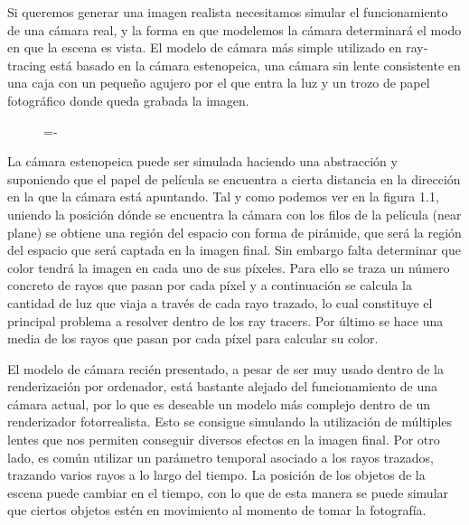 Si queremos generar una imagen realista necesitamos simular el funcionamiento de una cámara real, y la forma en que modelemos la cámara determinará el modo en que la escena es vista. El modelo de cámara más simple utilizado en ray-tracing está basado en la cámara estenopeica, una cámara sin lente consistente en una caja con un pequeño agujero por el que entra la luz y un trozo de papel fotográfico donde queda grabada la imagen.

\begin{figure}[h]
  \lineskip=-\fboxrule
\end{figure}

La cámara estenopeica puede ser simulada haciendo una abstracción y suponiendo que el papel de película se encuentra a cierta distancia en la dirección en la que la cámara está apuntando. Tal y como podemos ver en la figura 1.1, uniendo la posición dónde se encuentra la cámara con los filos de la película (near plane) se obtiene una región del espacio con forma de pirámide, que será la región del espacio que será captada en la imagen final. Sin embargo falta determinar que color tendrá la imagen en cada uno de sus píxeles. Para ello se traza un número concreto de rayos que pasan por cada píxel y a continuación se calcula la cantidad de luz que viaja a través de cada rayo trazado, lo cual constituye el principal problema a resolver dentro de los ray tracers. Por último se hace una media de los rayos que pasan por cada píxel para calcular su color.

El modelo de cámara recién presentado, a pesar de ser muy usado dentro de la renderización por ordenador, está bastante alejado del funcionamiento de una cámara actual, por lo que es deseable un modelo más complejo dentro de un renderizador fotorrealista. Esto se consigue simulando la utilización de múltiples lentes que nos permiten conseguir diversos efectos en la imagen final. Por otro lado, es común utilizar un parámetro temporal asociado a los rayos trazados, trazando varios rayos a lo largo del tiempo. La posición de los objetos de la escena puede cambiar en el tiempo, con lo que de esta manera se puede simular que ciertos objetos estén en movimiento al momento de tomar la fotografía. 


